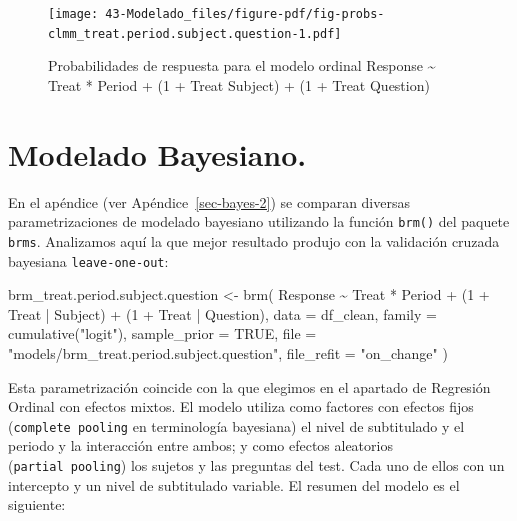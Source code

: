 \documentclass[
  12pt,
  a4paper,
  extrafontsizes,
  onecolumn,
  openright]{memoir}
\newenvironment{Shaded}{\begin{snugshade}}{\end{snugshade}}
\newcommand{\AttributeTok}[1]{\textcolor[rgb]{0.40,0.45,0.13}{#1}}
\newcommand{\ConstantTok}[1]{\textcolor[rgb]{0.56,0.35,0.01}{#1}}
\newcommand{\DecValTok}[1]{\textcolor[rgb]{0.68,0.00,0.00}{#1}}
\newcommand{\FunctionTok}[1]{\textcolor[rgb]{0.28,0.35,0.67}{#1}}
\newcommand{\NormalTok}[1]{\textcolor[rgb]{0.00,0.23,0.31}{#1}}
\newcommand{\OtherTok}[1]{\textcolor[rgb]{0.00,0.23,0.31}{#1}}
\newcommand{\SpecialCharTok}[1]{\textcolor[rgb]{0.37,0.37,0.37}{#1}}
\newcommand{\StringTok}[1]{\textcolor[rgb]{0.13,0.47,0.30}{#1}}
\begin{document}
\begin{figure}[h]

{\centering \texttt{[image: 43-Modelado\_files/figure-pdf/fig-probs-clmm\_treat.period.subject.question-1.pdf]}

}

\caption{\label{fig-probs-clmm_treat.period.subject.question}Probabilidades
de respuesta para el modelo ordinal Response \textasciitilde{} Treat *
Period + (1 + Treat \textbar{} Subject) + (1 + Treat \textbar{}
Question)}

\end{figure}

\hypertarget{modelado-bayesiano.}{%
\section{Modelado Bayesiano.}\label{modelado-bayesiano.}}

En el apéndice (ver Apéndice~\ref{sec-bayes-2}) se comparan diversas
parametrizaciones de modelado bayesiano utilizando la función
\texttt{brm()} del paquete \texttt{brms}. Analizamos aquí la que mejor
resultado produjo con la validación cruzada bayesiana
\texttt{leave-one-out}:

\scriptsize

\begin{Shaded}
\begin{Highlighting}[]
\NormalTok{brm\_treat.period.subject.question }\OtherTok{\textless{}{-}} \FunctionTok{brm}\NormalTok{(}
\NormalTok{    Response }\SpecialCharTok{\textasciitilde{}}\NormalTok{ Treat }\SpecialCharTok{*}\NormalTok{ Period }\SpecialCharTok{+}\NormalTok{ (}\DecValTok{1} \SpecialCharTok{+}\NormalTok{ Treat }\SpecialCharTok{|}\NormalTok{ Subject) }\SpecialCharTok{+}\NormalTok{ (}\DecValTok{1} \SpecialCharTok{+}\NormalTok{ Treat }\SpecialCharTok{|}\NormalTok{ Question),}
    \AttributeTok{data =}\NormalTok{ df\_clean,}
    \AttributeTok{family =} \FunctionTok{cumulative}\NormalTok{(}\StringTok{"logit"}\NormalTok{),}
    \AttributeTok{sample\_prior =} \ConstantTok{TRUE}\NormalTok{,}
    \AttributeTok{file =} \StringTok{"models/brm\_treat.period.subject.question"}\NormalTok{,}
    \AttributeTok{file\_refit =} \StringTok{"on\_change"}
\NormalTok{)}
\end{Highlighting}
\end{Shaded}

\normalsize

Esta parametrización coincide con la que elegimos en el apartado de
Regresión Ordinal con efectos mixtos. El modelo utiliza como factores
con efectos fijos (\texttt{complete\ pooling} en terminología bayesiana)
el nivel de subtitulado y el periodo y la interacción entre ambos; y
como efectos aleatorios (\texttt{partial\ pooling}) los sujetos y las
preguntas del test. Cada uno de ellos con un intercepto y un nivel de
subtitulado variable. El resumen del modelo es el siguiente:
\end{document}

